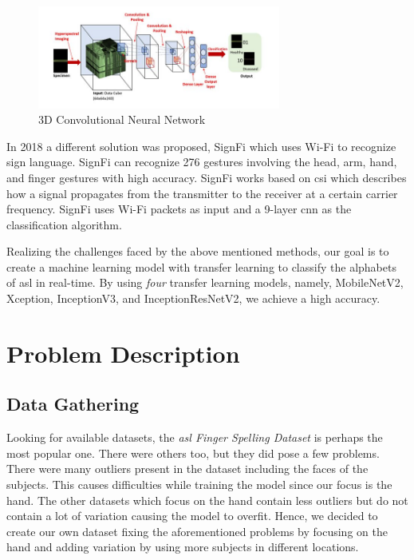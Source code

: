 \documentclass[twocolumn]{article}
\newcommand{\mobilenet}{MobileNetV2}
\newcommand{\xception}{Xception}
\newcommand{\inception}{InceptionV3}
\newcommand{\resnet}{InceptionResNetV2}
\begin{document}
\begin{figure}[h]
\centering
\includegraphics[width=8cm]{./figures/3d cnn}
\caption{3D Convolutional Neural Network}
\end{figure}

In 2018 a different solution was proposed, SignFi \cite{ma2018signfi} which 
uses Wi-Fi to recognize sign language. SignFi can recognize 276 gestures 
involving the head, arm, hand, and finger gestures with high accuracy. SignFi 
works based on \gls{csi} which describes how a signal propagates from the 
transmitter to the receiver at a certain carrier frequency. SignFi uses Wi-Fi 
packets as input and a 9-layer \gls{cnn} as the classification algorithm.

Realizing the challenges faced by the above mentioned methods, our goal is to 
create a machine learning model with transfer learning to classify the 
alphabets of \gls{asl} in real-time. By using \textit{four} transfer learning 
models, namely, \mobilenet \cite{sandler2018mobilenetv2}, 
\xception \cite{chollet2017xception}, \inception \cite{szegedy2016rethinking}, 
and \resnet \cite{szegedy2017inception}, we achieve a high accuracy.

\section{Problem Description}

\subsection{Data Gathering}

Looking for available datasets, the \textit{\gls{asl} Finger Spelling Dataset} 
\cite{pugeault2011spelling} is perhaps the most popular one. There were others 
too, but they did pose a few problems. There were many outliers present in the 
dataset including the faces of the subjects. This causes difficulties while 
training the model since our focus is the hand. The other datasets which focus 
on the hand contain less outliers but do not contain a lot of variation 
causing the model to overfit. Hence, we decided to create our own dataset 
fixing the aforementioned problems by focusing on the hand and adding 
variation by using more subjects in different locations.
\end{document}
